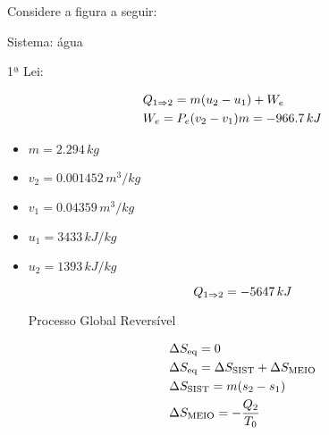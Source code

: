 \begin{Exerc}[8.117 6\pa Ed.]
Considere a figura a seguir:


\end{Exerc}

\begin{sol}


Sistema: água

1ª Lei: 

\[
\begin{gathered}
  Q_{1 \imp 2} = m(u_2 - u_1) + W_e \hfill \\
  W_e = P_e (v_2 - v_1) m = -966.7\,kJ \hfill \\ 
\end{gathered} 
\]

\begin{itemize}
\item $m = 2.294\,kg$
\item $v_2 = 0.001452\,m^3/kg$
\item $v_1 = 0.04359\,m^3/kg$
\item $u_1 = 3433\,kJ/kg$
\item $u_2 = 1393\,kJ/kg$

\[
Q_{1 \Rightarrow 2} = -5647\,kJ
\]

Processo Global Reversível

\[
\begin{gathered}
  \Delta S_{\text{eq}} = 0 \hfill \\
  \Delta S_{\text{eq}} = \Delta S_{\text{SIST}} + \Delta S_{\text{MEIO}} \hfill \\
  \Delta S_{\text{SIST}} = m(s_2 - s_1) \hfill \\
  \Delta S_{\text{MEIO}} = -\frac{Q_2}{T_0} \hfill \\ 
\end{gathered} 
\]

\end{itemize}

\end{sol}